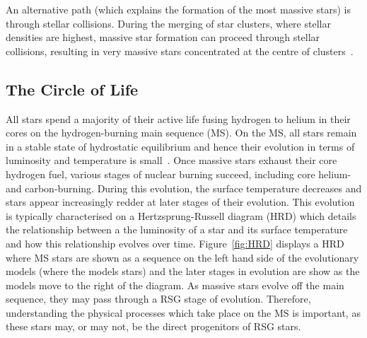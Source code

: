 An alternative path (which explains the formation of the most massive stars) is through stellar collisions.
During the merging of star clusters, where stellar densities are highest, massive star formation can proceed through stellar collisions, resulting in very massive stars concentrated at the centre of clusters~\citep{Fujii13}.



\subsection{The Circle of Life} %
\label{sub:life_cycle}

All stars spend a majority of their active life fusing hydrogen to helium in their cores on the hydrogen-burning main sequence (MS).
On the MS, all stars remain in a stable state of hydrostatic equilibrium and hence their evolution in terms of luminosity and temperature is small~\citep{2012sse..book.....K}.
Once massive stars exhaust their core hydrogen fuel, various stages of nuclear burning succeed, including core helium- and carbon-burning.
During this evolution, the surface temperature decreases and stars appear increasingly redder at later stages of their evolution.
This evolution is typically characterised on a Hertzsprung-Russell diagram (HRD) which details the relationship between a the luminosity of a star and its surface temperature and how this relationship evolves over time.
Figure~\ref{fig:HRD} displays a HRD where MS stars are shown as a sequence on the left hand side of the evolutionary models (where the models stars) and the later stages in evolution are show as the models move to the right of the diagram.
As massive stars evolve off the main sequence, they may pass through a RSG stage of evolution.
Therefore, understanding the physical processes which take place on the MS is important, as these stars may, or may not, be the direct progenitors of RSG stars.

